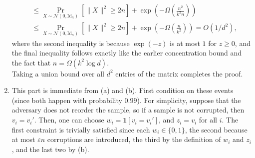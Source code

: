 \documentclass[11pt]{article}
\theoremstyle{definition}
\renewcommand{\epsilon}{\varepsilon}
\newcommand{\Id}{\mathrm{Id}}
\newcommand{\indic}{\mathbf{1}}
\begin{document}
\begin{enumerate}[label=(\alph*)]
\begin{align*}
      &\le \Pr_{X \sim \mathcal{N}(0,\Id_n)}[\|X\|^2 \ge 2n] + \exp\left( - \Omega\left( \frac{n^2}{k^2n} \right) \right) \\
      &\le \Pr_{X \sim \mathcal{N}(0,\Id_n)}[\|X\|^2 \ge 2n] + \exp\left( - \Omega\left( \frac{n}{k^2} \right) \right) = O(1/d^2),
  \end{align*}
  where the second inequality is because $\exp(-z)$ is at most $1$ for $z \ge 0$, and the final inequality follows exactly like the earlier concentration bound and the fact that $n = \Omega(k^2 \log d)$.\\
  Taking a union bound over all $d^2$ entries of the matrix completes the proof.

  \item This part is immediate from (a) and (b). First condition on these events (since both happen with probability $0.99$). For simplicity, suppose that the adversary does not reorder the sample, so if a sample is not corrupted, then $v_i = v_i'$. Then, one can choose $w_i = \indic[v_i = v_i']$, and $z_i = v_i$ for all $i$. The first constraint is trivially satisfied since each $w_i \in \{0,1\}$, the second because at most $\epsilon n$ corruptions are introduced, the third by the definition of $w_i$ and $z_i$, and the last two by (b).


\end{enumerate}
\end{document}
